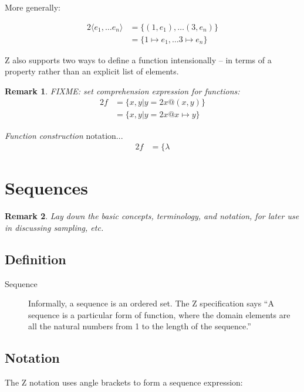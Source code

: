 \documentclass[reqno,12pt]{tufte-book}
\numberwithin{equation}{subsection}
\newtheorem{remark}{Remark}
\begin{document}
\noindent More generally:

\begin{alignat}{2}
  \langle e_1,\ldots e_n\rangle &= \{(1,e_1),\ldots (3,e_n)\} \\
  &= \{1\mapsto e_1,\ldots 3\mapsto e_n\}
\end{alignat}

Z also supports two ways to define a function intensionally -- in
terms of a property rather than an explicit list of elements.

\begin{remark}
FIXME: set comprehension expression for functions:
\begin{alignat}{2}
  f &= \{x,y | y=2x @ (x,y)\} \\
  &= \{x,y | y=2x @ x\mapsto y\}
\end{alignat}
\end{remark}

\textit{Function construction} notation...
\begin{alignat}{2}
  f &= \{\lambda
\end{alignat}


\section{Sequences}
\label{subs:sequences}

\begin{remark}
  Lay down the basic concepts, terminology, and notation, for later
  use in discussing sampling, etc.
\end{remark}

\subsection{Definition}

\begin{description}
\item [Sequence] Informally, a sequence is an ordered set.  The Z
  specification says ``A sequence is a particular form of function,
  where the domain elements are all the natural numbers from 1 to the
  length of the sequence.''
\end{description}

\subsection{Notation}

The Z notation uses angle brackets to form a sequence expression:
\end{document}
